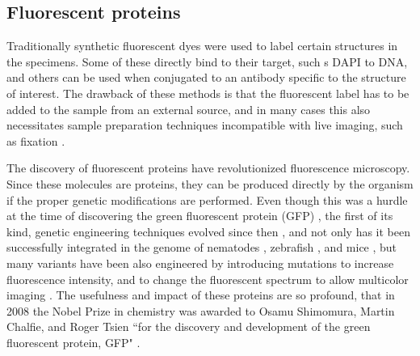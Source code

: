 

  \subsection{Fluorescent proteins}
    Traditionally synthetic fluorescent dyes were used to label certain structures in the specimens. Some of these directly bind to their target, such s DAPI to DNA, and others can be used when conjugated to an antibody specific to the structure of interest. The drawback of these methods is that the fluorescent label has to be added to the sample from an external source, and in many cases this also necessitates sample preparation techniques incompatible with live imaging, such as fixation \cite{!!!}.

    The discovery of fluorescent proteins have revolutionized fluorescence microscopy. Since these molecules are proteins, they can be produced directly by the organism if the proper genetic modifications are performed. Even though this was a hurdle at the time of discovering the green fluorescent protein (GFP) \cite{shimomura_extraction_1962}, the first of its kind, genetic engineering techniques evolved since then \cite{prasher_primary_1992}, and not only has it been successfully integrated in the genome of nematodes \cite{chalfie_green_1994}, zebrafish \cite{amsterdam_aequorea_1995}, and mice \cite{okabe_green_1997}, but many variants have been also engineered by introducing mutations to increase fluorescence intensity, and to change the fluorescent spectrum to allow multicolor imaging \cite{heim_wavelength_1994,heim_engineering_1996,cormack_facs-optimized_1996,okabe_green_1997}. The usefulness and impact of these proteins are so profound, that in 2008 the Nobel Prize in chemistry was awarded to Osamu Shimomura, Martin Chalfie, and Roger Tsien ``for the discovery and development of the green fluorescent protein, GFP" \cite{service_three_2008}.
    


